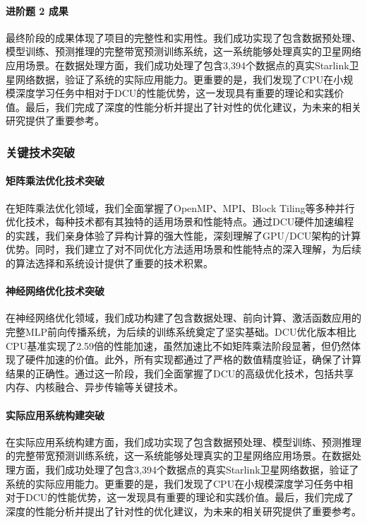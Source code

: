 \documentclass[a4paper]{article}
\begin{document}
\paragraph{进阶题 2 成果}

最终阶段的成果体现了项目的完整性和实用性。我们成功实现了包含数据预处理、模型训练、预测推理的完整带宽预测训练系统，这一系统能够处理真实的卫星网络应用场景。在数据处理方面，我们成功处理了包含3,394个数据点的真实Starlink卫星网络数据，验证了系统的实际应用能力。更重要的是，我们发现了CPU在小规模深度学习任务中相对于DCU的性能优势，这一发现具有重要的理论和实践价值。最后，我们完成了深度的性能分析并提出了针对性的优化建议，为未来的相关研究提供了重要参考。

\subsubsection{关键技术突破}

\paragraph{矩阵乘法优化技术突破}

在矩阵乘法优化领域，我们全面掌握了OpenMP、MPI、Block Tiling等多种并行优化技术，每种技术都有其独特的适用场景和性能特点。通过DCU硬件加速编程的实践，我们亲身体验了异构计算的强大性能，深刻理解了GPU/DCU架构的计算优势。同时，我们建立了对不同优化方法适用场景和性能特点的深入理解，为后续的算法选择和系统设计提供了重要的技术积累。

\paragraph{神经网络优化技术突破}

在神经网络优化领域，我们成功构建了包含数据处理、前向计算、激活函数应用的完整MLP前向传播系统，为后续的训练系统奠定了坚实基础。DCU优化版本相比CPU基准实现了2.59倍的性能加速，虽然加速比不如矩阵乘法阶段显著，但仍然体现了硬件加速的价值。此外，所有实现都通过了严格的数值精度验证，确保了计算结果的正确性。通过这一阶段，我们全面掌握了DCU的高级优化技术，包括共享内存、内核融合、异步传输等关键技术。

\paragraph{实际应用系统构建突破}

在实际应用系统构建方面，我们成功实现了包含数据预处理、模型训练、预测推理的完整带宽预测训练系统，这一系统能够处理真实的卫星网络应用场景。在数据处理方面，我们成功处理了包含3,394个数据点的真实Starlink卫星网络数据，验证了系统的实际应用能力。更重要的是，我们发现了CPU在小规模深度学习任务中相对于DCU的性能优势，这一发现具有重要的理论和实践价值。最后，我们完成了深度的性能分析并提出了针对性的优化建议，为未来的相关研究提供了重要参考。
\end{document}

